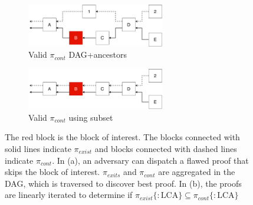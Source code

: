 \begin{figure}[ht]
\begin{subfigure}{.5\textwidth}
  \centering
  \includegraphics[width=6cm]{../images/Subset_1.pdf}
  \caption{Valid $\pi_{cont}$ DAG+ancestors}
  \label{figure:before__subset}
\end{subfigure}
\begin{subfigure}{.5\textwidth}
  \centering
  \includegraphics[width=6cm]{../images/Subset_2.pdf}
  \caption{Valid $\pi_{cont}$ using subset}
  \label{figure:after_subset}
\end{subfigure}

\caption{ The red block is the block of interest. The blocks connected with
    solid lines indicate $\pi_{exist}$ and blocks connected with dashed lines
    indicate $\pi_{cont}$. In (a), an adversary can dispatch a flawed proof
    that skips the block of interest.  $\pi_{exits}$ and $\pi_{cont}$ are
aggregated in the  DAG, which is traversed to discover best proof. In (b), the
proofs are linearly iterated to determine if $\pi_{exist}\{:\textrm{LCA}\}
\subseteq \pi_{cont}\{:\textrm{LCA} \}$ }
\label{fig:fig}
\end{figure}

